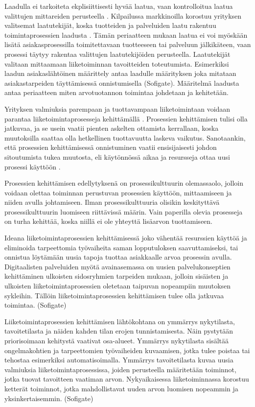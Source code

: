 \documentclass[finnish,12pt,a4paper,pdftex]{article}
\begin{document}
Laadulla ei tarkoiteta ekplisiittisesti hyvää laatua, vaan kontrolloitua laatua valittujen mittareiden perusteella \citep{okaytannot}. Kilpailussa markkinoilla korostuu yrityksen valitsemat laatutekijät, koska tuotteiden ja palveluiden laatu rakentuu toimintaprosessien laadusta \citep{ohjelmistotuotanto, teollisuustalous}. Tämän periaatteen mukaan laatua ei voi myöskään lisätä asiakasprosessilla toimitettavaan tuotteeseen tai palveluun jälkikäteen, vaan prosessi täytyy rakentaa valittujen laatutekijöiden perusteella. Laatutekijät valitaan mittaamaan liiketoiminnan tavoitteiden toteutumista. Esimerkiksi laadun asiakaslähtöinen määrittely antaa laadulle määrityksen joka mitataan asiakastarpeiden täyttämisessä onnistumisella (Sofigate). Määritelmä laadusta antaa periaatteen miten arvotuotannon toimintaa johdetaan ja kehitetään. 

Yrityksen valmiuksia parempaan ja tuottavampaan liiketoimintaan voidaan parantaa liiketoimintaprosesseja kehittämällä \citep{teollisuustalous, leanit, ohjelmistotuotanto}. Prosessien kehittämisen tulisi olla jatkuvaa, ja se usein vaatii pienten askelten ottamista kerrallaan, koska muutoksilla saattaa olla hetkellinen tuottavuutta laskeva vaikutus. Sanotaankin, että prosessien kehittämisessä onnistuminen vaatii ensisijaisesti johdon sitoutumista tukea muutosta, eli käytönnössä aikaa ja resursseja ottaa uusi prosessi käyttöön \citep{okaytannot}.

Prosessien kehittämisen edellytyksenä on prosessikulttuurin olemassaolo, jolloin voidaan olettaa toiminnan perustuvan prosessien käyttöön, mittaamiseen ja niiden avulla johtamiseen. Ilman prosessikulttuuria olisikin keskityttävä prosessikulttuurin luomiseen riittävissä määrin. Vain paperilla olevia prosesseja on turha kehittää, koska niillä ei ole yhteyttä lisäarvon tuottamiseen. \citep{teollisuustalous}

Ideana liiketoimintaprosessien kehittämisessä joko vähentää resurssien käyttöä ja eliminoida tarpeettomia työvaiheita saman lopputuloksen saavuttamiseksi, tai onnistua löytämään uusia tapoja tuottaa asiakkaalle arvoa prosessin avulla. Digitaalisten palveluiden myötä avainasemassa on uusien palvelukonseptien kehittäminen ulkoisten sidosryhmien tarpeiden mukaan, jolloin sisäisten ja ulkoisten liiketoimintaprosessien oletetaan taipuvan nopeampiin muutoksen sykleihin. Tällöin liiketoimintaprosessien kehittämisen tulee olla jatkuvaa toimintaa. (Sofigate) 

Liiketoimintaprosessien kehittämisen lähtökohtana on ymmärrys nykytilasta, tavoitetilasta ja näiden kahden tilan erojen tunnistamisesta. Näin pystytään priorisoimaan kehitystä vaativat osa-alueet. Ymmärrys nykytilasta sisältää ongelmakohtien ja tarpeettomien työvaiheiden kuvaamisen, jotka tulee poistaa tai tehostaa esimerkiksi automatisoimalla. Ymmärrys tavoitetilasta kuvaa uusia valmiuksia liiketoimintaprosessissa, joiden perusteella määritetään toiminnot, jotka tuovat tavoitteen vaatiman arvon. Nykyaikaisessa liiketoiminnassa korostuu ketterät toiminnot, jotka mahdollistavat uuden arvon luomisen nopeammin ja yksinkertaisemmin. (Sofigate)
\end{document}
